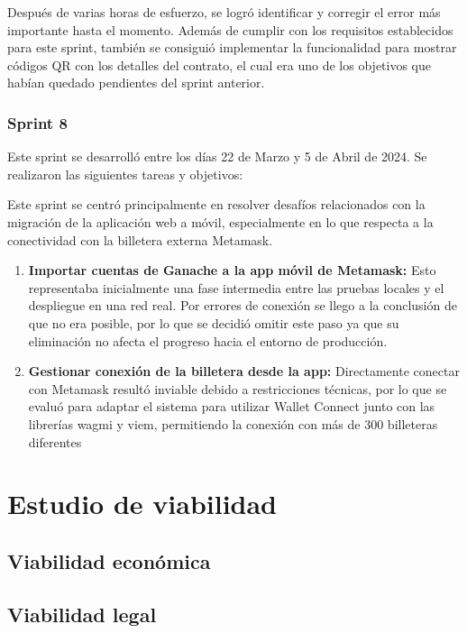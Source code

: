 Después de varias horas de esfuerzo, se logró identificar y corregir el error más importante hasta el momento. Además de cumplir con los requisitos establecidos para este sprint, también se consiguió implementar la funcionalidad para mostrar códigos QR con los detalles del contrato, el cual era uno de los objetivos que habían quedado pendientes del sprint anterior. 

\subsubsection{Sprint 8}

Este sprint se desarrolló entre los días 22 de Marzo y 5 de Abril de 2024. Se realizaron las siguientes tareas y objetivos:

Este sprint se centró principalmente en resolver desafíos relacionados con la migración de la aplicación web a móvil, especialmente en lo que respecta a la conectividad con la billetera externa Metamask.

\begin{enumerate}

\item \textbf{Importar cuentas de Ganache a la app móvil de Metamask:} Esto representaba inicialmente una fase intermedia entre las pruebas locales y el despliegue en una red real.
Por errores de conexión se llego a la conclusión de que no era posible, por lo que se decidió omitir este paso ya que su eliminación no afecta el progreso hacia el entorno de producción.

\item \textbf{Gestionar conexión de la billetera desde la app:} Directamente conectar con Metamask resultó inviable debido a restricciones técnicas, por lo que se evaluó para adaptar el sistema para utilizar Wallet Connect junto con las librerías wagmi y viem, permitiendo la conexión con más de 300 billeteras diferentes

\end{enumerate}



\section{Estudio de viabilidad}

\subsection{Viabilidad económica}

\subsection{Viabilidad legal}


